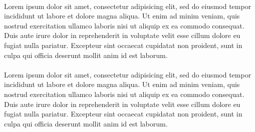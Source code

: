 \documentclass[hyp]{socreport}
\begin{document}
\begin{acknowledgement}
\paragraph{}
Lorem ipsum dolor sit amet, consectetur adipisicing elit, sed do eiusmod tempor incididunt ut labore et dolore magna aliqua. Ut enim ad minim veniam, quis nostrud exercitation ullamco laboris nisi ut aliquip ex ea commodo consequat. Duis aute irure dolor in reprehenderit in voluptate velit esse cillum dolore eu fugiat nulla pariatur. Excepteur sint occaecat cupidatat non proident, sunt in culpa qui officia deserunt mollit anim id est laborum.

\paragraph{}
Lorem ipsum dolor sit amet, consectetur adipisicing elit, sed do eiusmod tempor incididunt ut labore et dolore magna aliqua. Ut enim ad minim veniam, quis nostrud exercitation ullamco laboris nisi ut aliquip ex ea commodo consequat. Duis aute irure dolor in reprehenderit in voluptate velit esse cillum dolore eu fugiat nulla pariatur. Excepteur sint occaecat cupidatat non proident, sunt in culpa qui officia deserunt mollit anim id est laborum.
\end{acknowledgement}

\listoffigures
\listoftables
\tableofcontents





 





\appendix
\end{document}
